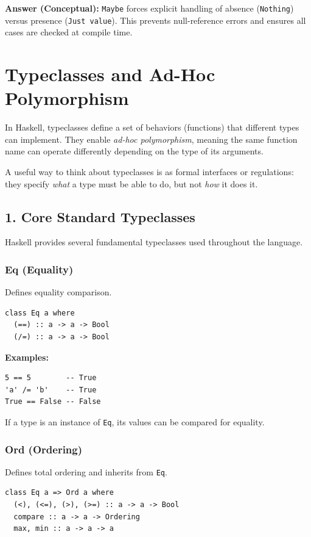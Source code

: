 \documentclass[12pt]{article}
\begin{document}
\textbf{Answer (Conceptual):} \texttt{Maybe} forces explicit handling of absence (\texttt{Nothing}) versus presence (\texttt{Just value}). This prevents null-reference errors and ensures all cases are checked at compile time.


\section{Typeclasses and Ad-Hoc Polymorphism}

In Haskell, typeclasses define a set of behaviors (functions) that different types can implement. They enable \emph{ad-hoc polymorphism}, meaning the same function name can operate differently depending on the type of its arguments.

A useful way to think about typeclasses is as formal interfaces or regulations: they specify \emph{what} a type must be able to do, but not \emph{how} it does it.

\subsection{1. Core Standard Typeclasses}

Haskell provides several fundamental typeclasses used throughout the language.

\subsubsection{Eq (Equality)}

Defines equality comparison.

\begin{verbatim}
class Eq a where
  (==) :: a -> a -> Bool
  (/=) :: a -> a -> Bool
\end{verbatim}

\textbf{Examples:}
\begin{verbatim}
5 == 5        -- True
'a' /= 'b'    -- True
True == False -- False
\end{verbatim}

If a type is an instance of \texttt{Eq}, its values can be compared for equality.

\subsubsection{Ord (Ordering)}

Defines total ordering and inherits from \texttt{Eq}.

\begin{verbatim}
class Eq a => Ord a where
  (<), (<=), (>), (>=) :: a -> a -> Bool
  compare :: a -> a -> Ordering
  max, min :: a -> a -> a
\end{verbatim}
\end{document}
